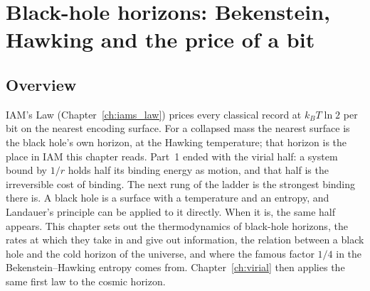 \providecommand{\authorhold}[1]{\par\smallskip\noindent\fbox{\parbox{0.95\linewidth}{\small\textbf{Author hold.} #1}}\par\smallskip}

\chapter{Black-hole horizons: Bekenstein, Hawking and the price of a bit}\label{ch:blackholes}

\section*{Overview}
IAM's Law (Chapter~\ref{ch:iams_law}) prices every classical record at $k_BT\ln2$ per bit on the nearest encoding surface. For a collapsed
mass the nearest surface is the black hole's own horizon, at the Hawking temperature; that horizon is the place in IAM this chapter reads.
Part~1 ended with the virial half: a system bound by $1/r$ holds half its binding energy as motion, and that half is the irreversible cost of binding. The
next rung of the ladder is the strongest binding there is. A black hole is a surface with a temperature and an entropy, and Landauer's principle can be
applied to it directly. When it is, the same half appears. This chapter sets out the thermodynamics of black-hole horizons, the rates at which they
take in and give out information, the relation between a black hole and the cold horizon of the universe, and where the famous factor $1/4$ in the
Bekenstein--Hawking entropy comes from. Chapter~\ref{ch:virial} then applies the same first law to the cosmic horizon.

